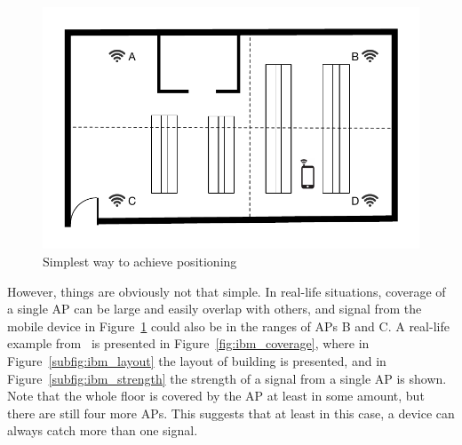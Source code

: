 \documentclass[12pt,a4paper,oneside,pdftex]{report}
\begin{document}
\begin{figure}
    \label{fig:position_1}
    \includegraphics{images/positioning_1.pdf}
    \caption{Simplest way to achieve positioning}
\end{figure}

However, things are obviously not that simple. In real-life situations, coverage of a single AP can be large and easily overlap with others, and signal from the mobile device in Figure~\ref{fig:position_1} could also be in the ranges of APs B and C. A real-life example from~\cite{xiang2004} is presented in Figure~\ref{fig:ibm_coverage}, where in Figure~\ref{subfig:ibm_layout} the layout of building is presented, and in Figure~\ref{subfig:ibm_strength} the strength of a signal from a single AP is shown. Note that the whole floor is covered by the AP at least in some amount, but there are still four more APs. This suggests that at least in this case, a device can always catch more than one signal.
\end{document}
